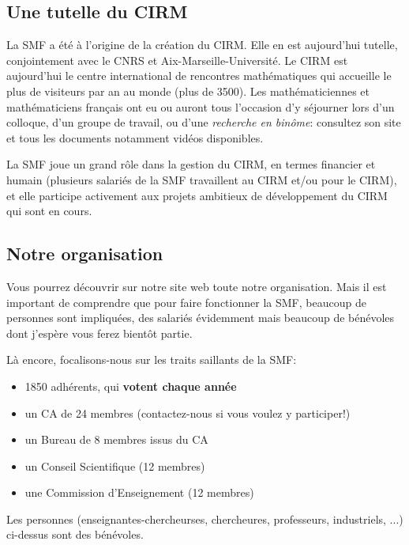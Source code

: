 \subsection*{Une tutelle du CIRM}  La SMF a \'{e}t\'{e} \`{a} l'origine de la cr\'{e}ation du CIRM. Elle en est aujourd'hui tutelle, conjointement avec le CNRS et Aix-Marseille-Universit\'e. Le CIRM est aujourd'hui le centre international de rencontres math\'{e}matiques qui accueille le plus de visiteurs par an au monde (plus de 3500). Les math\'{e}maticiennes et math\'ematiciens fran\c{c}ais ont eu ou auront tous l'occasion d'y s\'{e}journer lors d'un colloque, d'un groupe de travail, ou d'une {\sl recherche en bin\^{o}me}: consultez   son site  et tous les documents notamment vid\'eos disponibles.

La SMF joue un grand r\^ole dans la gestion du CIRM, en termes financier et humain (plusieurs salari\'es de la SMF travaillent au CIRM et/ou pour le CIRM), et elle participe activement aux projets ambitieux de d\'eveloppement du CIRM qui sont en cours.
 
 
 

\subsection*{Notre organisation}

Vous pourrez d\'ecouvrir sur notre site web toute notre organisation. Mais il est important de comprendre que pour faire fonctionner la SMF, beaucoup de personnes sont impliqu\'ees, des salari\'es \'evidemment mais beaucoup de b\'en\'evoles dont j'esp\`ere vous ferez bient\^ot partie. 

L\`a encore, focalisons-nous sur les traits saillants de la SMF:
\begin{itemize}
\item
1850 adh\'erents, qui {\bf votent chaque ann\'ee}
 
 
\item un CA de 24 membres (contactez-nous si vous voulez y participer!)
\item un Bureau de 8 membres issus du CA
\item un Conseil Scientifique (12 membres)
 
\item une Commission d'Enseignement (12 membres)


\end{itemize}
Les personnes (enseignant\mp e\mp s-chercheur\mp se\mp s, chercheur\mp e\mp s, professeurs, industriels, ...) ci-dessus sont des b\'en\'evoles.


